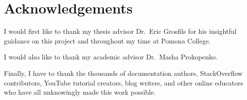 \chapter*{Acknowledgements}

I would first like to thank my thesis advisor Dr.\ Eric Grosfils for his insightful guidance on this project and throughout my time at Pomona College.

I would also like to thank my academic advisor Dr.\ Masha Prokopenko.

Finally, I have to thank the thousands of documentation authors, StackOverflow contributors, YouTube tutorial creators, blog writers, and other online educators who have all unknowingly made this work possible. 